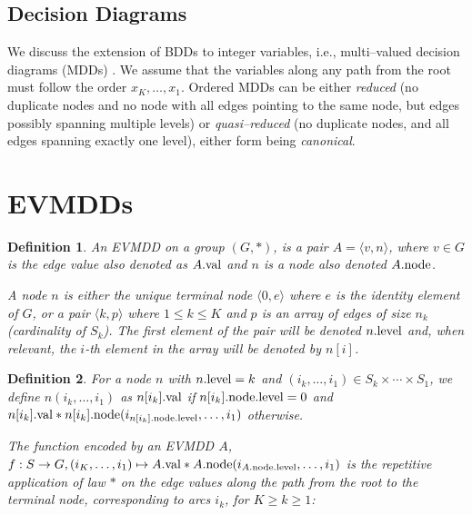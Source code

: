 \documentclass[a4paper]{easychair}
\newcommand{\edge}[2]{\langle #1, #2 \rangle}
\newcommand{\val}[1]{#1{\rm .val}}
\newcommand{\node}[1]{#1{\rm .node}}
\newcommand{\level}[1]{#1{\rm .level}}
\newtheorem{definition}{Definition}
\begin{document}
\subsection{Decision Diagrams}

We discuss the extension of BDDs to integer variables,
i.e., multi--valued decision diagrams (MDDs) \cite{Kam1998}.
We assume that the variables along any path from the root must follow 
the order $x_K, \ldots, x_1$. Ordered MDDs can be either \emph{reduced} 
(no duplicate nodes and no node with all edges pointing to the same 
node, but edges possibly spanning multiple levels) or 
\emph{quasi--reduced} (no duplicate nodes, and all edges spanning 
exactly one level), either form being \emph{canonical}.

\section{EVMDDs}

\begin{definition}{\rm  \label{DEF:evmdd}}
An \emph{EVMDD} on a group $(G, *)$, is a pair $A = \edge{v}{n}$,
where $v \in G$ is the edge \emph{value} also denoted as $\val{A}$ 
and $n$ is a \emph{node} also denoted $\node{A}$. 

A \emph{node} $n$ is either the unique terminal node $\langle 0, e 
\rangle$ where $e$ is the identity element of $G$, or a pair $\langle k, 
p \rangle$ where $1 \leq k \leq K$ and $p$ is an array of edges of size 
$n_k$ (cardinality of $S_k$). 
The first element of the pair will be denoted $\level{n}$ and, when relevant,
the $i$-th element in the array will be denoted by $n[i]$.
\end{definition}

\begin{definition}{\rm  \label{DEF:evmdd-function}}
For a node $n$ with $\level{n} = k$ and 
$\left(i_k,\ldots, i_1\right) \in S_k \times \cdots \times S_1$,
we define $n(i_k,\ldots, i_1)$ as $\val{n[i_k]}$ if $\level{\node{n[i_k]}} = 0$ and
$\val{n[i_k]}*\node{n[i_k]}(i_{\level{\node{n[i_k]}}},\ldots, i_1)$ otherwise.


The \emph{function encoded} by an EVMDD $A$,
$f : S \rightarrow G, (i_K,\ldots, i_1) \mapsto \val{A} * \node{A}(i_{\level{\node{A}}},\ldots, i_1)$
is the repetitive  application of law $*$  on the edge values along the path
from the root to the terminal node,
corresponding to arcs $i_k$, for $K\geq k \geq 1$:
\end{definition}
\end{document}
